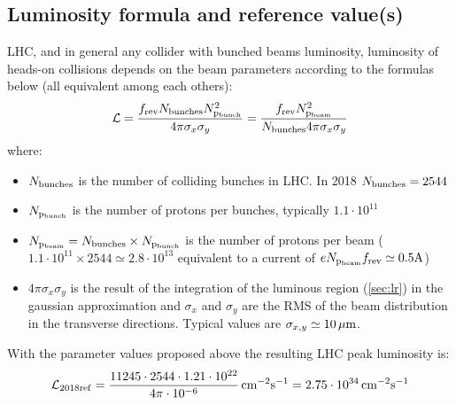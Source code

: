 \documentclass[10pt]{article}
\begin{document}
\subsection{Luminosity formula and reference value(s)}
LHC, and in general any collider with bunched beams luminosity, luminosity of heads-on collisions depends on the beam parameters according to the formulas below (all equivalent among each others):
\begin{equation}
{\cal L} = \frac{f_{\rm rev}N_{\rm bunches}N_{\rm p_{bunch}}^2}{4\pi\sigma_x\sigma_y}
= \frac{f_{\rm rev}N_{\rm p_{beam}}^2}{N_{\rm bunches}4\pi\sigma_x\sigma_y}
\label{LHClumi}
\end{equation}
where:
\begin{itemize}
\item $N_{\rm bunches}$ is the number of colliding bunches in LHC. In 2018 $N_{\rm bunches}=2544$ 
\item $N_{\rm p_{bunch}}$ is the number of protons per bunches, typically $1.1\cdot 10^{11}$ 
\item $N_{\rm p_{beam}} = N_{\rm bunches}\times N_{\rm p_{bunch}}$ is the number of protons per beam ($1.1\cdot 10^{11} \times 2544 \simeq 2.8\cdot 10^{13}$ equivalent to a current of $eN_{\rm p_{beam}}f_{\rm rev} \simeq 0.5 {\rm A}$)
\item $4\pi\sigma_x\sigma_y$ is the result of the integration of the luminous region (\ref{sec:lr}) in the gaussian approximation and $\sigma_x$ and $\sigma_y$ are the RMS of the beam distribution in the transverse directions. Typical values are $\sigma_{x,y}\simeq 10\,\mu{\rm m}$.
\end{itemize}
With the parameter values proposed above the resulting LHC peak luminosity is:
\begin{equation}
{\cal L}_{\rm 2018ref}=\frac{11245\cdot 2544\cdot 1.21\cdot 10^{22}}{4\pi\cdot 10^{-6}}\,{\rm cm^{-2}s^{-1}} = 2.75\cdot 10^{34}\,{\rm cm^{-2}s^{-1}}
\end{equation}
%
\end{document}
